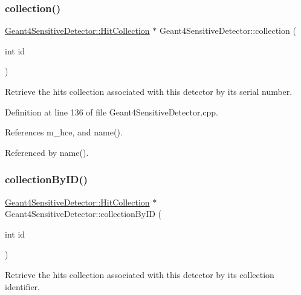 \subsubsection{\texorpdfstring{collection()}{collection()}}
{\footnotesize\ttfamily \hyperlink{class_d_d4hep_1_1_simulation_1_1_geant4_sensitive_detector_a4865cf9c96edfef8cd41e309a4cd6211}{Geant4\+Sensitive\+Detector\+::\+Hit\+Collection} $\ast$ Geant4\+Sensitive\+Detector\+::collection (\begin{DoxyParamCaption}\item[{int}]{id }\end{DoxyParamCaption})}



Retrieve the hits collection associated with this detector by its serial number. 



Definition at line 136 of file Geant4\+Sensitive\+Detector.\+cpp.



References m\+\_\+hce, and name().



Referenced by name().

\hypertarget{class_d_d4hep_1_1_simulation_1_1_geant4_sensitive_detector_a45d013173dd5a1b159e2bb2bfca12d56}{}\label{class_d_d4hep_1_1_simulation_1_1_geant4_sensitive_detector_a45d013173dd5a1b159e2bb2bfca12d56} 
\subsubsection{\texorpdfstring{collection\+By\+I\+D()}{collectionByID()}}
{\footnotesize\ttfamily \hyperlink{class_d_d4hep_1_1_simulation_1_1_geant4_sensitive_detector_a4865cf9c96edfef8cd41e309a4cd6211}{Geant4\+Sensitive\+Detector\+::\+Hit\+Collection} $\ast$ Geant4\+Sensitive\+Detector\+::collection\+By\+ID (\begin{DoxyParamCaption}\item[{int}]{id }\end{DoxyParamCaption})}



Retrieve the hits collection associated with this detector by its collection identifier. 



